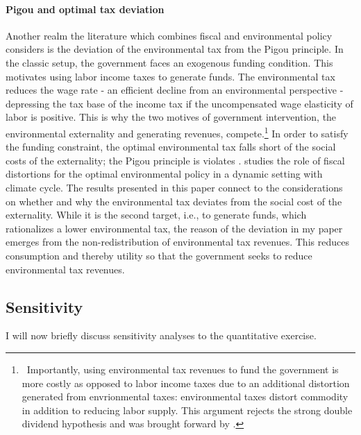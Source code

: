 \paragraph{Pigou and optimal tax deviation}


Another realm the literature which combines fiscal and environmental policy considers is the deviation of the environmental tax from the Pigou principle. In the classic setup, the government faces an exogenous funding condition. This motivates using labor income taxes to generate funds. 
The environmental tax reduces the wage rate - an efficient decline from an environmental perspective - depressing the tax base of the income tax if the uncompensated wage elasticity of labor is positive.  This is why the two motives of government intervention, the environmental externality and generating revenues, compete.\footnote{\ Importantly, using environmental tax revenues to fund the government is more costly as opposed to labor income taxes due to an additional distortion generated from envrionmental taxes: environmental taxes distort commodity in addition to reducing labor supply. This argument rejects the strong double dividend hypothesis and was brought forward by \cite{LansBovenberg1994EnvironmentalTaxation}. } 
In order to satisfy the funding constraint, the optimal environmental tax falls short of the social costs of the externality; the Pigou principle is violates \citep{LansBovenberg1996OptimalAnalyses}. \cite{Barrage2019OptimalPolicy} studies the role of fiscal distortions for the optimal environmental policy in a dynamic setting with climate cycle. 
The results presented in this paper connect to the considerations on whether and why the environmental tax deviates from the social cost of the externality. While it is the second target, i.e., to generate funds, which rationalizes a lower environmental tax, the reason of the deviation in my paper emerges from the non-redistribution of environmental tax revenues. This reduces consumption and thereby utility so that the government seeks to reduce environmental tax revenues.

\subsection{Sensitivity}
I will now briefly discuss sensitivity analyses to the quantitative exercise. 
